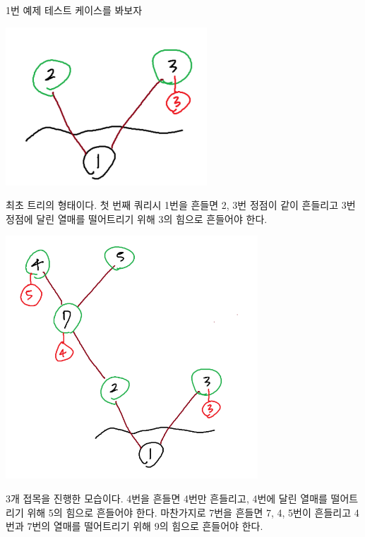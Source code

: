 1번 예제 테스트 케이스를 봐보자

\begin{center}

\includegraphics[bb=0 0 100 200]{1img.png}

\end{center} 
최초 트리의 형태이다. 첫 번째 쿼리시 1번을 흔들면 2, 3번 정점이 같이 흔들리고 3번 정점에 달린 열매를 떨어트리기 위해 3의 힘으로 흔들어야 한다.

\begin{center}

\includegraphics[bb=0 0 100 200]{2img.png}

\end{center} 
3개 접목을 진행한 모습이다. 4번을 흔들면 4번만 흔들리고, 4번에 달린 열매를 떨어트리기 위해 5의 힘으로 흔들어야 한다.
마찬가지로 7번을 흔들면 7, 4, 5번이 흔들리고 4번과 7번의 열매를 떨어트리기 위해 9의 힘으로 흔들어야 한다.

